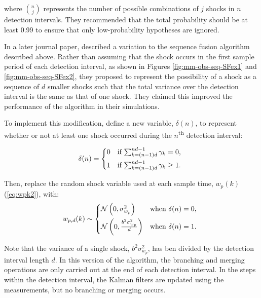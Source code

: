 where $\binom{n}{j}$ represents the number of possible combinations of $j$ shocks in $n$ detection intervals. They recommended that the total probability should be at least 0.99 to ensure that only low-probability hypotheses are ignored.

In a later journal paper, \cite{robertson_method_1998} described a variation to the sequence fusion algorithm described above.  Rather than assuming that the shock occurs in the first sample period of each detection interval, as shown in Figures \ref{fig:mm-obs-seq-SFex1} and \ref{fig:mm-obs-seq-SFex2}, they proposed to represent the possibility of a shock as a sequence of $d$ smaller shocks such that the total variance over the detection interval is the same as that of one shock. They claimed this improved the performance of the algorithm in their simulations.

To implement this modification, define a new variable, $\delta(n)$, to represent whether or not at least one shock occurred during the $n$\textsuperscript{th} detection interval:

\begin{equation} \label{eq:deltak}
	\delta(n) = \begin{cases*}
		0 & \text{if} $\sum_{k=(n-1) d}^{n d - 1}{\gamma_k} = 0$, \\
		1 & \text{if} $\sum_{k=(n-1) d}^{n d - 1}{\gamma_k} \ge 1$.
	\end{cases*}
\end{equation}

Then, replace the random shock variable used at each sample time, $w_p(k)$ (\ref{eq:wpk2}), with:
\begin{equation} \label{eq:wpdk}
	w_{p,d}(k) \sim 
	\begin{cases*}
		\mathcal{N}\left(0, \sigma_{w_p}^2\right) & \text{when} $\delta(n) = 0$, \\
		\mathcal{N}\left(0, \frac{b^2\sigma_{w_p}^2}{d}\right) & \text{when} $\delta(n) = 1$.
	\end{cases*}
\end{equation}

Note that the variance of a single shock, $b^2\sigma_{w_p}^2$, has ben divided by the detection interval length $d$. In this version of the algorithm, the branching and merging operations are only carried out at the end of each detection interval. In the steps within the detection interval, the Kalman filters are updated using the measurements, but no branching or merging occurs.

